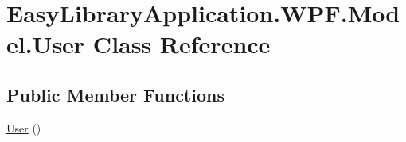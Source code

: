 \hypertarget{class_easy_library_application_1_1_w_p_f_1_1_model_1_1_user}{}\section{Easy\+Library\+Application.\+W\+P\+F.\+Model.\+User Class Reference}
\label{class_easy_library_application_1_1_w_p_f_1_1_model_1_1_user}
\subsection*{Public Member Functions}
\begin{DoxyCompactItemize}
\item 
\mbox{\hyperlink{class_easy_library_application_1_1_w_p_f_1_1_model_1_1_user_a5754ecf82cf8923703ed9621132cc1d5}{User}} ()
\end{DoxyCompactItemize}
